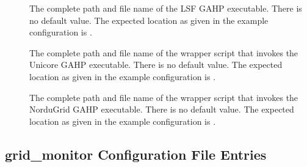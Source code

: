 \begin{description}
\item[]
\label{param:LSFGAHP} The complete path and file name of the
LSF GAHP executable.
There is no default value. The expected location as given
in the example configuration is .

\item[]
\label{param:UnicoreGAHP} The complete path and file name of the
wrapper script that invokes the Unicore GAHP executable.
There is no default value. The expected location as given
in the example configuration is .

\item[]
\label{param:NorduGridGAHP} The complete path and file name of the
wrapper script that invokes the NorduGrid GAHP executable.
There is no default value. The expected location as given
in the example configuration is .

\end{description}

\subsection{\label{sec:GridMonitor-Config-File-Entries}grid\_monitor
Configuration File Entries}

